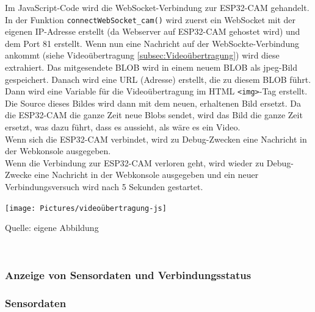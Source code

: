 \documentclass[ngerman,12pt,a4paper]{article}
\begin{document}
	Im JavaScript-Code wird die WebSocket-Verbindung zur ESP32-CAM gehandelt. In der Funktion \texttt{connectWebSocket\_cam()} wird zuerst ein WebSocket mit der eigenen IP-Adresse erstellt (da Webserver auf ESP32-CAM gehostet wird) und dem Port 81 erstellt. Wenn nun eine Nachricht auf der WebSockte-Verbindung ankommt (siehe Videoübertragung \ref{subsec:Videoübertragung}) wird diese extrahiert. Das mitgesendete BLOB wird in einem neuem BLOB als jpeg-Bild gespeichert. Danach wird eine URL (Adresse) erstellt, die zu diesem BLOB führt. Dann wird eine Variable für die Videoübertragung im HTML \texttt{<img>}-Tag erstellt. Die Source dieses Bildes wird dann mit dem neuen, erhaltenen Bild ersetzt. Da die ESP32-CAM die ganze Zeit neue Blobs sendet, wird das Bild die ganze Zeit ersetzt, was dazu führt, dass es aussieht, als wäre es ein Video. \\[0.5cm]
	Wenn sich die ESP32-CAM verbindet, wird zu Debug-Zwecken eine Nachricht in der Webkonsole ausgegeben. \\[0.5cm]
	Wenn die Verbindung zur ESP32-CAM verloren geht, wird wieder zu Debug-Zwecke eine Nachricht in der Webkonsole ausgegeben und ein neuer Verbindungsversuch wird nach 5 Sekunden gestartet. \\[0.5cm]
	\begin{center}
		\begin{minipage}[t]{\textwidth}
			\texttt{[image: Pictures/videoübertragung-js]}
			\label{fig:videoübertragung-js}
			\vspace{-10pt}
			\begin{center}
				\par\small Quelle: eigene Abbildung 
			\end{center}
		\end{minipage} \\[0.75cm]
	\end{center}
	
	
			
			\subsubsection{Anzeige von Sensordaten und Verbindungsstatus}
			
				\subsubsection*{Sensordaten}	
			
\end{document}
